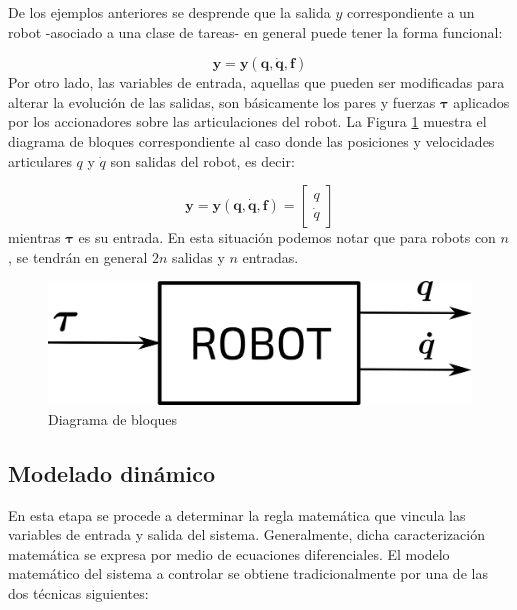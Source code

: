 De los ejemplos anteriores se desprende que la salida $\boldsymbol{\mathit{y}}$ correspondiente a un robot -asociado a una clase de tareas- en general puede tener la forma funcional:

 $$\boldsymbol{y=y(q,\dot{q},f)}$$
 \linebreak
Por otro lado, las variables de entrada, aquellas que pueden ser modificadas para alterar la evolución de las salidas, son básicamente los pares y fuerzas $\boldsymbol{\tau}$ aplicados por los accionadores sobre las articulaciones del robot. \newpage
La Figura \ref{dBloq} muestra el diagrama de bloques correspondiente al caso donde las posiciones y velocidades articulares $\boldsymbol{\mathit{q}}$ y  $\boldsymbol{\mathit{\dot{q}}}$ son salidas del robot, es decir:

$$\boldsymbol{y=y(q,\dot{q},f)}= \begin{bmatrix}
\boldsymbol{\mathit{q}}\\
\boldsymbol{\mathit{\dot{q}}}
\end{bmatrix}$$
\linebreak
mientras $\boldsymbol{\tau}$ es su entrada. En esta situación podemos notar que para robots con $\mathit{n}$, se tendrán en general $\mathit{2n}$ salidas y $\mathit{n}$ entradas.

\begin{figure}[h!]
	\centering
	\includegraphics[scale=0.5]{Capitulo3/figs/diagBloq.png} 
	\caption{Diagrama de bloques}
	\label{dBloq}
\end{figure}

\subsection{Modelado dinámico}

En esta etapa se procede a determinar la regla matemática que vincula las variables de entrada y salida del sistema. Generalmente, dicha caracterización matemática se expresa por medio de ecuaciones diferenciales. El modelo matemático del sistema a controlar se obtiene tradicionalmente por una de las dos técnicas siguientes:

